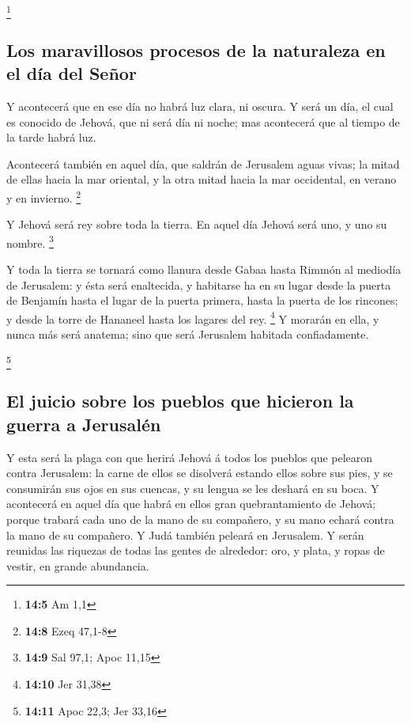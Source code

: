 \footnote{\textbf{14:5} Am 1,1}

\hypertarget{los-maravillosos-procesos-de-la-naturaleza-en-el-duxeda-del-seuxf1or}{%
\subsection{Los maravillosos procesos de la naturaleza en el día del
Señor}\label{los-maravillosos-procesos-de-la-naturaleza-en-el-duxeda-del-seuxf1or}}

 Y acontecerá que en ese día no habrá luz clara, ni oscura.
 Y será un día, el cual es conocido de Jehová, que ni será
día ni noche; mas acontecerá que al tiempo de la tarde habrá luz.

 Acontecerá también en aquel día, que saldrán de Jerusalem
aguas vivas; la mitad de ellas hacia la mar oriental, y la otra mitad
hacia la mar occidental, en verano y en invierno. \footnote{\textbf{14:8}
  Ezeq 47,1-8}

 Y Jehová será rey sobre toda la tierra. En aquel día Jehová
será uno, y uno su nombre. \footnote{\textbf{14:9} Sal 97,1; Apoc 11,15}

 Y toda la tierra se tornará como llanura desde Gabaa hasta
Rimmón al mediodía de Jerusalem: y ésta será enaltecida, y habitarse ha
en su lugar desde la puerta de Benjamín hasta el lugar de la puerta
primera, hasta la puerta de los rincones; y desde la torre de Hananeel
hasta los lagares del rey. \footnote{\textbf{14:10} Jer 31,38}
 Y morarán en ella, y nunca más será anatema; sino que será
Jerusalem habitada confiadamente.

\footnote{\textbf{14:11} Apoc 22,3; Jer 33,16}

\hypertarget{el-juicio-sobre-los-pueblos-que-hicieron-la-guerra-a-jerusaluxe9n}{%
\subsection{El juicio sobre los pueblos que hicieron la guerra a
Jerusalén}\label{el-juicio-sobre-los-pueblos-que-hicieron-la-guerra-a-jerusaluxe9n}}

 Y esta será la plaga con que herirá Jehová á todos los
pueblos que pelearon contra Jerusalem: la carne de ellos se disolverá
estando ellos sobre sus pies, y se consumirán sus ojos en sus cuencas, y
su lengua se les deshará en su boca.  Y acontecerá en aquel
día que habrá en ellos gran quebrantamiento de Jehová; porque trabará
cada uno de la mano de su compañero, y su mano echará contra la mano de
su compañero.  Y Judá también peleará en Jerusalem. Y serán
reunidas las riquezas de todas las gentes de alrededor: oro, y plata, y
ropas de vestir, en grande abundancia.

